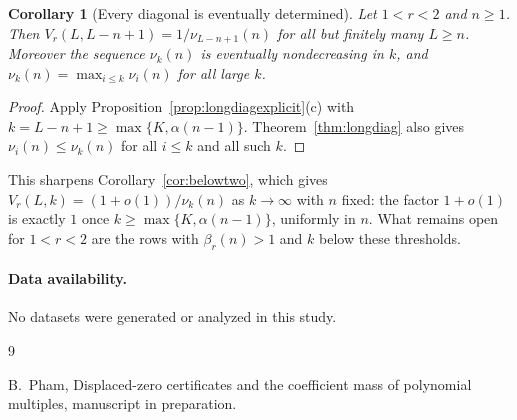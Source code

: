 \documentclass[11pt]{article}
\newtheorem{corollary}[theorem]{Corollary}
\begin{document}
\begin{corollary}[Every diagonal is eventually determined]\label{cor:longdiagfinite}
Let $1<r<2$ and $n\ge1$.  Then $V_r(L,L-n+1)=1/\nu_{L-n+1}(n)$ for all but
finitely many $L\ge n$.  Moreover the sequence $\nu_k(n)$ is eventually
nondecreasing in $k$, and $\nu_k(n)=\max_{i\le k}\nu_i(n)$ for all large $k$.
\end{corollary}

\begin{proof}
Apply Proposition~\ref{prop:longdiagexplicit}(c) with $k=L-n+1\ge\max\{K,\alpha(n-1)\}$.
Theorem~\ref{thm:longdiag} also gives $\nu_i(n)\le\nu_k(n)$ for all
$i\le k$ and all such $k$.
\end{proof}

This sharpens Corollary~\ref{cor:belowtwo}, which gives
$V_r(L,k)=(1+o(1))/\nu_k(n)$ as $k\to\infty$ with $n$ fixed: the factor
$1+o(1)$ is exactly $1$ once $k\ge\max\{K,\alpha(n-1)\}$, uniformly in $n$.
What remains open for $1<r<2$ are the rows with $\beta_r(n)>1$ and $k$
below these thresholds.

\paragraph{Data availability.}
No datasets were generated or analyzed in this study.

\begin{thebibliography}{9}

B.~Pham,
\newblock Displaced-zero certificates and the coefficient mass of polynomial
multiples,
\newblock manuscript in preparation.

\end{thebibliography}
\end{document}
